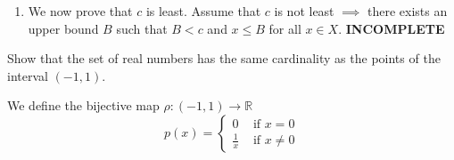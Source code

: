 \begin{solution}
\begin{enumerate}
\begin{enumerate}
          We choose the natural number $n = \lceil \frac{2(b_0 - a_0)}{\epsilon} \rceil$, which does not satisfy the inequality above since 
          \begin{equation}
            \epsilon < \frac{1}{n} (b_0 - a_0) = \frac{1}{\lceil 2(b_0 - a_0)/\epsilon \rceil} (b_0 - a_0) \leq \frac{\epsilon}{2(b_0 - a_0)} (b_0 - a_0) = \frac{\epsilon}{2}
          \end{equation}
          This leads to a contradiction. 
          \item We now prove that $c$ is least. Assume that $c$ is not least $\implies$ there exists an upper bound $B$ such that $B < c$ and $x \leq B$ for all $x \in X$. \textbf{INCOMPLETE}
      \end{enumerate}
    \end{enumerate}
  \end{solution}

  \begin{exercise}[Zorich 2.4.1]
  Show that the set of real numbers has the same cardinality as the points of the interval $(-1, 1)$. 
  \end{exercise}
  \begin{solution}
    We define the bijective map $\rho: (-1, 1) \to \mathbb{R}$ 
    \begin{equation}
      p(x) = \begin{cases}
          0 & \text{ if } x = 0 \\
          \frac{1}{x} & \text{ if } x \neq 0
          \end{cases}
    \end{equation}
  \end{solution}

